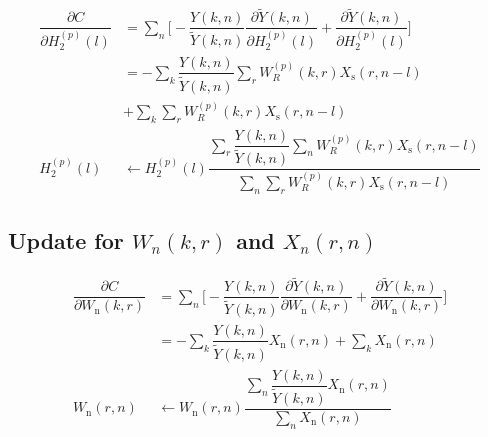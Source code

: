 \begin{align}
\dfrac{\partial C}{\partial H_2^{(p)}(l)} &= \sum_n \Bigg[-\dfrac{Y(k,n)}{\tilde{Y}(k,n)} \dfrac{\partial \tilde{Y}(k,n)}{\partial H_2^{(p)}(l)} + \dfrac{\partial \tilde{Y}(k,n)}{\partial H_2^{(p)}(l)} \Bigg] \nonumber \\
&= -\sum_k \dfrac{Y(k,n)}{\tilde{Y}(k,n)} \sum_r W_R^{(p)}(k,r)X_{\text{s}}(r,n-l)\nonumber \\ 
& + \sum_k \sum_r W_R^{(p)}(k,r) X_{\text{s}}(r,n-l) \nonumber \\
H_2^{(p)}(l) &\leftarrow H_2^{(p)}(l) \dfrac{\sum\limits_r \dfrac{Y(k,n)}{\tilde{Y}(k,n)}\sum\limits_n W_R^{(p)}(k,r)X_{\text{s}}(r,n-l)}{\sum\limits_n \sum\limits_r W_R^{(p)}(k,r) X_{\text{s}}(r,n-l)}
\label{eq:updateH2}
\end{align}

\subsection{Update for $W_n(k,r)$ and $X_n(r,n)$}
\label{sec:update_noise}

\begin{align}
\dfrac{\partial C}{\partial W_{\text{n}}(k,r)} &= \sum_n \Bigg[-\dfrac{Y(k,n)}{\tilde{Y}(k,n)} \dfrac{\partial \tilde{Y}(k,n)}{\partial W_{\text{n}}(k,r)} + \dfrac{\partial \tilde{Y}(k,n)}{\partial W_{\text{n}}(k,r)} \Bigg]  \nonumber \\
&= -\sum_k \dfrac{Y(k,n)}{\tilde{Y}(k,n)} X_{\text{n}}(r,n) + \sum_k X_{\text{n}}(r,n) \nonumber \\ 
W_{\text{n}}(r,n) &\leftarrow W_{\text{n}}(r,n) \dfrac{\sum\limits_n \dfrac{Y(k,n)}{\tilde{Y}(k,n)} X_{\text{n}}(r,n)}{\sum\limits_n X_{\text{n}}(r,n)}
\label{eq:updateWn}
\end{align}

